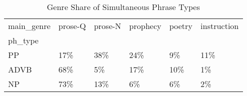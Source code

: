 \begin{table}[htbp!]
\centering
\caption{Genre Share of Simultaneous Phrase Types}
\label{table:simgenph_pc}
\begin{tabular}{llllll}
\toprule
main\_genre & prose-Q & prose-N & prophecy & poetry & instruction \\
ph\_type &         &         &          &        &             \\
\midrule
PP      &     17\% &     38\% &      24\% &     9\% &         11\% \\
ADVB    &     68\% &      5\% &      17\% &    10\% &          1\% \\
NP      &     73\% &     13\% &       6\% &     6\% &          2\% \\
\bottomrule
\end{tabular}
\end{table}
